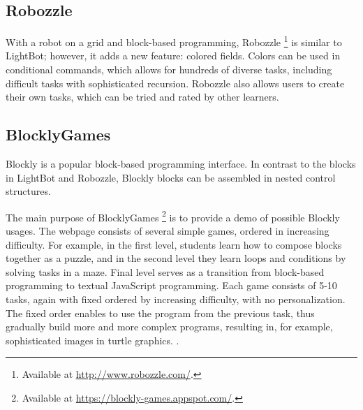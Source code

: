


\subsection{Robozzle}
\label{sec:robozzle}
With a robot on a grid and block-based programming, Robozzle%
  \footnote{Available at \url{http://www.robozzle.com/}.}
  is similar to LightBot;
however, it adds a new feature: colored fields.
Colors can be used in conditional commands,
  which allows for hundreds of diverse tasks,
  including difficult tasks with sophisticated recursion.
Robozzle also allows users to create their own tasks,
  which can be tried and rated by other learners.



\subsection{BlocklyGames}
\label{sec:blockly-games}
Blockly is a popular block-based programming interface.
In contrast to the blocks in LightBot and Robozzle,
Blockly blocks can be assembled in nested control structures.

The main purpose of BlocklyGames%
\footnote{Available at \url{https://blockly-games.appspot.com/}.}
is to provide a demo of possible Blockly usages.
The webpage consists of several simple games, ordered in increasing difficulty.
For example, in the first level, students learn how to compose blocks together as a puzzle,
and in the second level they learn loops and conditions by solving tasks in a maze.
Final level serves as a transition from block-based programming to textual JavaScript programming.
Each game consists of 5-10 tasks, again with fixed ordered by increasing difficulty, with no personalization.
The fixed order enables to use the program from the previous task,
thus gradually build more and more complex programs,
resulting in, for example, sophisticated images in turtle graphics.
\cite{blockly-10-things}.



